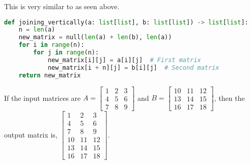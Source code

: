\begin{explanation}
	This is very similar to as seen above.
	\begin{lstlisting}[language=Python]
def joining_vertically(a: list[list], b: list[list]) -> list[list]:
    n = len(a)
    new_matrix = null(len(a) + len(b), len(a))
    for i in range(n):
        for j in range(n):
            new_matrix[i][j] = a[i][j]  # First matrix
            new_matrix[i + n][j] = b[i][j]  # Second matrix
    return new_matrix \end{lstlisting}
	If the input matrices are $A=\begin{bmatrix}
			1 & 2 & 3 \\
			4 & 5 & 6 \\
			7 & 8 & 9
		\end{bmatrix}$ and $B=\begin{bmatrix}
			10 & 11 & 12 \\
			13 & 14 & 15 \\
			16 & 17 & 18
		\end{bmatrix}$, then the output matrix is, $\begin{bmatrix}
			1  & 2  & 3  \\
			4  & 5  & 6  \\
			7  & 8  & 9  \\
			10 & 11 & 12 \\
			13 & 14 & 15 \\
			16 & 17 & 18
		\end{bmatrix}$.
\end{explanation}
